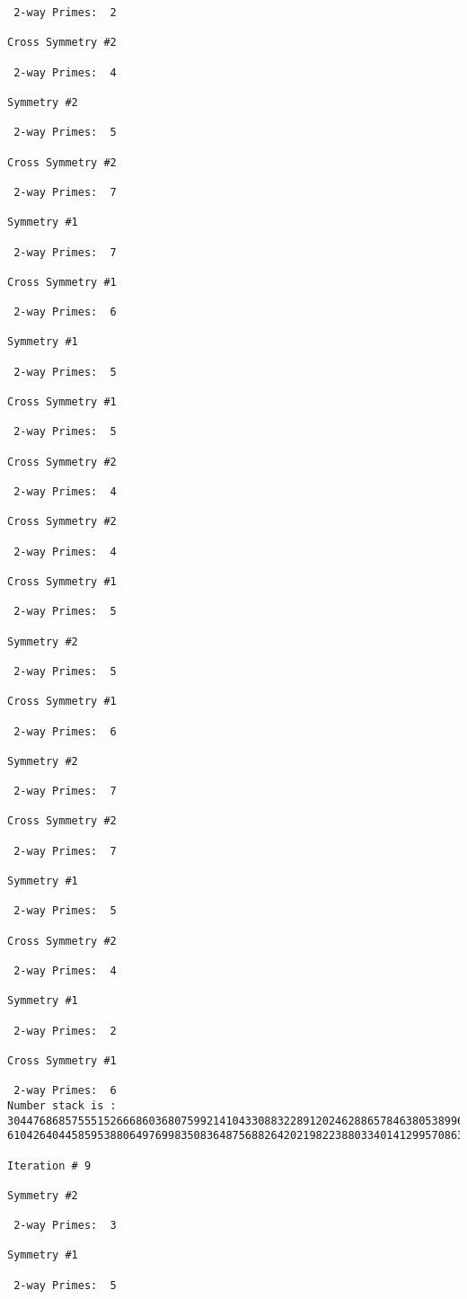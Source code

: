 \begin{verbatim}
 2-way Primes: 	2

Cross Symmetry #2

 2-way Primes: 	4

Symmetry #2

 2-way Primes: 	5

Cross Symmetry #2

 2-way Primes: 	7

Symmetry #1

 2-way Primes: 	7

Cross Symmetry #1

 2-way Primes: 	6

Symmetry #1

 2-way Primes: 	5

Cross Symmetry #1

 2-way Primes: 	5

Cross Symmetry #2

 2-way Primes: 	4

Cross Symmetry #2

 2-way Primes: 	4

Cross Symmetry #1

 2-way Primes: 	5

Symmetry #2

 2-way Primes: 	5

Cross Symmetry #1

 2-way Primes: 	6

Symmetry #2

 2-way Primes: 	7

Cross Symmetry #2

 2-way Primes: 	7

Symmetry #1

 2-way Primes: 	5

Cross Symmetry #2

 2-way Primes: 	4

Symmetry #1

 2-way Primes: 	2

Cross Symmetry #1

 2-way Primes: 	6
Number stack is :
30447686857555152666860368075992141043308832289120246288657846380538996794608835958544046240163340857
61042640445859538806497699835083648756882642021982238803340141299570863068666251555758686744037580433

Iteration #	9

Symmetry #2

 2-way Primes: 	3

Symmetry #1

 2-way Primes: 	5


\end{verbatim}
